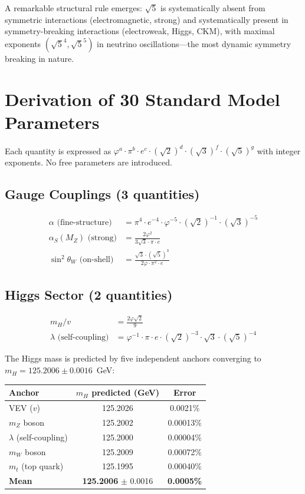 \documentclass[12pt,a4paper]{article}
\begin{document}
A remarkable structural rule emerges: $\sqrt{5}$ is systematically absent from symmetric interactions (electromagnetic, strong) and systematically present in symmetry-breaking interactions (electroweak, Higgs, CKM), with maximal exponents $(\sqrt{5}^4, \sqrt{5}^5)$ in neutrino oscillations---the most dynamic symmetry breaking in nature.

\section{Derivation of 30 Standard Model Parameters}

Each quantity is expressed as $\varphi^a \cdot \pi^b \cdot e^c \cdot (\sqrt{2})^d \cdot (\sqrt{3})^f \cdot (\sqrt{5})^g$ with integer exponents. No free parameters are introduced.

\subsection{Gauge Couplings (3 quantities)}

\begin{align}
\alpha \text{ (fine-structure)} &= \pi^4 \cdot e^{-4} \cdot \varphi^{-5} \cdot (\sqrt{2})^{-1} \cdot (\sqrt{3})^{-5} \label{eq:alpha}\\
\alpha_S(M_Z) \text{ (strong)} &= \frac{2\varphi^2}{3\sqrt{3} \cdot \pi \cdot e} \\
\sin^2\theta_W \text{ (on-shell)} &= \frac{\sqrt{3} \cdot (\sqrt{5})^3}{2\varphi \cdot \pi^2 \cdot e}
\end{align}

\subsection{Higgs Sector (2 quantities)}

\begin{align}
m_H / v &= \frac{2 \varphi \sqrt{2}}{9} \\
\lambda \text{ (self-coupling)} &= \varphi^{-1} \cdot \pi \cdot e \cdot (\sqrt{2})^{-3} \cdot \sqrt{3} \cdot (\sqrt{5})^{-4}
\end{align}

The Higgs mass is predicted by five independent anchors converging to $m_H = 125.2006 \pm 0.0016$~GeV:

\begin{center}
\begin{tabular}{lcc}
\toprule
Anchor & $m_H$ predicted (GeV) & Error \\
\midrule
VEV ($v$) & 125.2026 & 0.0021\% \\
$m_Z$ boson & 125.2002 & 0.00013\% \\
$\lambda$ (self-coupling) & 125.2000 & 0.00004\% \\
$m_W$ boson & 125.2009 & 0.00072\% \\
$m_t$ (top quark) & 125.1995 & 0.00040\% \\
\midrule
\textbf{Mean} & \textbf{125.2006} $\pm$ 0.0016 & \textbf{0.0005\%} \\
\bottomrule
\end{tabular}
\end{center}
\end{document}
